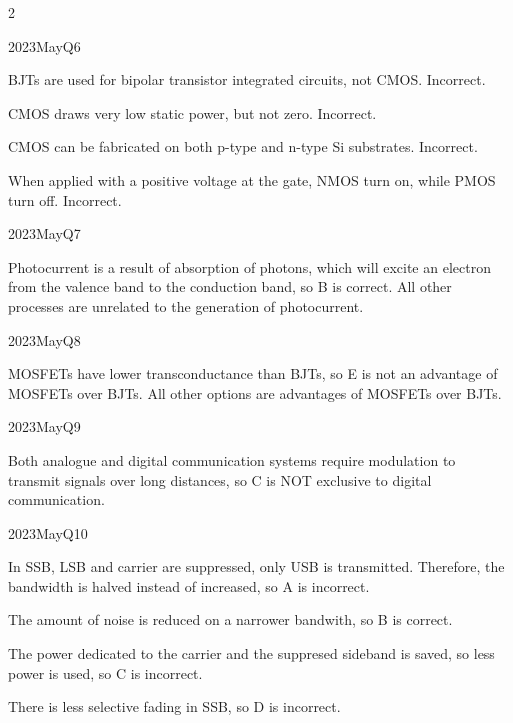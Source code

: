 \begin{multicols*}{2}
\begin{qsolution}{2023}{May}{Q6}{\tgElectronics \tgElectronicsCMOS \tgElectronicsBJT}

    \begin{enumualpha}
        \item BJTs are used for bipolar transistor integrated circuits, not CMOS. Incorrect.
        \item CMOS draws very low static power, but not zero. Incorrect.
        \item CMOS can be fabricated on both p-type and n-type Si substrates. Incorrect.
        \item When applied with a positive voltage at the gate, NMOS turn on, while PMOS turn off. Incorrect.
    \end{enumualpha}
\end{qsolution}

\begin{qsolution}{2023}{May}{Q7}{\tgElectronics \tgElectronicsOptoelectronics}

    Photocurrent is a result of absorption of photons, which will excite an electron from the valence band to the conduction band, so B is correct.
    All other processes are unrelated to the generation of photocurrent.
\end{qsolution}

\begin{qsolution}{2023}{May}{Q8}{\tgElectronics \tgElectronicsBJT \tgElectronicsMOSFET}

    MOSFETs have lower transconductance than BJTs, so E is not an advantage of MOSFETs over BJTs.
    All other options are advantages of MOSFETs over BJTs.
\end{qsolution}

\begin{qsolution}{2023}{May}{Q9}{\tgElectronics \tgElectronicsAnalogueDigital}

    Both analogue and digital communication systems require modulation to transmit signals over long distances, so C is NOT exclusive to digital communication.
\end{qsolution}

\begin{qsolution}{2023}{May}{Q10}{\tgElectronics \tgElectronicsAM}

    \begin{enumualpha}
        \item In SSB, LSB and carrier are suppressed, only USB is transmitted.
            Therefore, the bandwidth is halved instead of increased, so A is incorrect.
        \item The amount of noise is reduced on a narrower bandwith, so B is correct.
        \item The power dedicated to the carrier and the suppresed sideband is saved, so less power is used, so C is incorrect.
        \item There is less selective fading in SSB, so D is incorrect.
    \end{enumualpha}
\end{qsolution}


\end{multicols*}
